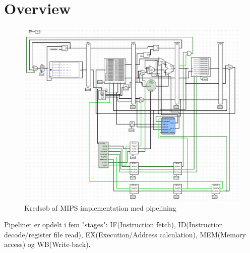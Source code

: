 \documentclass[12pt,a4paper,danish]{article}
\begin{document}
\section{Overview}
\begin{figure}[h!]
\centering
  \includegraphics[scale=0.4]{circuit.png}
  \caption{Kredsøb af MIPS implementation med pipelining}
  \label{fig:mips}
\end{figure}
Pipelinet er opdelt i fem "stages": IF(Instruction fetch), ID(Instruction decode/register file 
read), EX(Execution/Address calculation), MEM(Memory access) og WB(Write-back).
\end{document}
